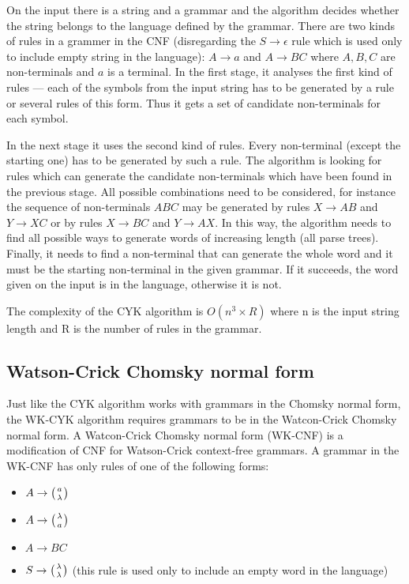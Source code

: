 On the input there is a string and a grammar and the algorithm decides whether the string belongs to the language defined by the grammar. There are two kinds of rules in a grammer in the CNF (disregarding the $S \rightarrow \epsilon$ rule which is used only to include empty string in the language): $A \rightarrow a$ and $A \rightarrow BC$ where $A, B, C$ are non-terminals and $a$ is a terminal. In the first stage, it analyses the first kind of rules --- each of the symbols from the input string has to be generated by a rule or several rules of this form. Thus it gets a set of candidate non-terminals for each symbol.

In the next stage it uses the second kind of rules. Every non-terminal (except the starting one) has to be generated by such a rule.
The algorithm is looking for rules which can generate the candidate non-terminals which have been found in the previous stage. All possible combinations need to be considered, for instance the sequence of non-terminals $ABC$ may be generated by rules $X \rightarrow AB$ and $Y \rightarrow XC$ or by rules $X \rightarrow BC$ and $Y \rightarrow AX$. In this way, the algorithm needs to find all possible ways to generate words of increasing length (all parse trees). Finally, it needs to find a non-terminal that can generate the whole word and it must be the starting non-terminal in the given grammar. If it succeeds, the word given on the input is in the language, otherwise it is not.

The complexity of the CYK algorithm is $O(n^3 \times R)$ where n is the input string length and R is the number of rules in the grammar.


\subsection{Watson-Crick Chomsky normal form}
Just like the CYK algorithm works with grammars in the Chomsky normal form, the WK-CYK algorithm requires grammars to be in the Watcon-Crick Chomsky normal form. A Watcon-Crick Chomsky normal form (WK-CNF) is a modification of CNF for Watson-Crick context-free grammars. A grammar in the WK-CNF has only rules of one of the following forms:

\begin{itemize}
  \item{$A \rightarrow \wkpair{a}{\lambda}$}
  \item{$A \rightarrow \wkpair{\lambda}{a}$}
  \item{$A \rightarrow B C$}
  \item{$S \rightarrow \wkpair{\lambda}{\lambda}$ (this rule is used only to include an empty word in the language)}
\end{itemize}

